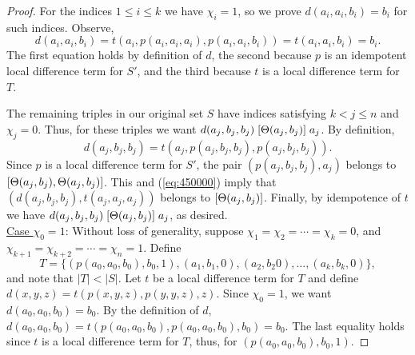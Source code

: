 \begin{proof}
For the indices $1\leq i \leq k$ we have $\chi_i =1$, so we prove
$d(a_i,a_i,b_i) = b_i$ for such indices. Observe,
\[
  d(a_i,a_i,b_i) =
  t(a_i, p(a_i,a_i,a_i), p(a_i,a_i,b_i)) %
  =t(a_i, a_i, b_i) %
  =b_i. %
\]
The first equation holds by definition of $d$, the second
because $p$ is an idempotent local difference term for
$S'$, and the third because $t$ is a local difference term for $T$.

The remaining triples in our original set $S$
have indices satisfying $k<j\leq n$ and $\chi_j = 0$.
Thus, for these triples we want
$d(a_j,b_j,b_j)\mathrel{[\Theta(a_j,b_j)]} a_j$.
By definition,
\begin{equation}
  \label{eq:450000}
d(a_j,b_j,b_j) =t(a_j, p(a_j,b_j,b_j), p(a_j,b_j,b_j)).  
\end{equation}
Since $p$ is a local difference term for $S'$, %
the pair $(p(a_j,b_j,b_j), a_j)$ belongs to $[\Theta(a_j,b_j), \Theta(a_j,b_j)]$.
This and 
(\ref{eq:450000}) imply
that 
$(d(a_j, b_j,b_j), t(a_j,a_j,a_j))$
belongs to
$[\Theta(a_j,b_j)]$.
Finally, by idempotence of $t$ we have
$d(a_j,b_j,b_j)\mathrel{[\Theta(a_j,b_j)]} a_j$,
as desired.
\\[4pt]
\underline{Case $\chi_0 = 1$}:
Without loss of generality, suppose $\chi_1 = \chi_2 =\cdots =\chi_k = 0$,
and $\chi_{k+1} = \chi_{k+2} = \cdots = \chi_{n} = 1$. Define 
\[
T = \{(p(a_0, a_0, b_0), b_0, 1),
(a_1, b_1, 0), (a_2, b_2 0), \dots, (a_k, b_k, 0)\},
\]
and note that $|T| < |S|$.
Let $t$ be a local difference term for $T$ and
define
$d(x,y,z) = t(p(x,y,z), p(y,y,z), z)$. 
Since $\chi_0 =1$, we want $d(a_0,a_0,b_0) = b_0$. By the definition of
$d$,
$d(a_0,a_0,b_0) =
t(p(a_0,a_0,b_0), p(a_0,a_0,b_0), b_0) =b_0$.
The last equality holds since $t$ is a local difference term for $T$, thus,
for $(p(a_0, a_0, b_0), b_0, 1)$.


\end{proof}

